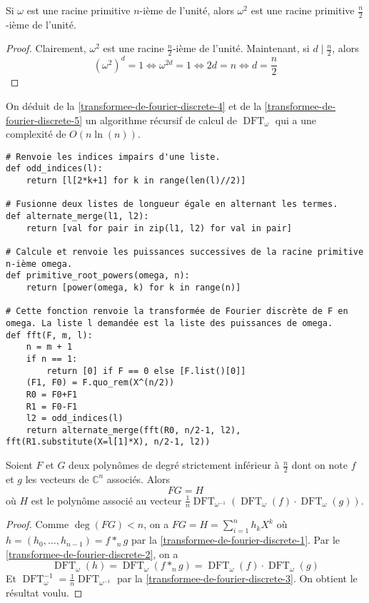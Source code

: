 	\begin{proposition}
		\label{transformee-de-fourier-discrete-5}
		Si $\omega$ est une racine primitive $n$-ième de l'unité, alors $\omega^2$ est une racine primitive $\frac{n}{2}$-ième de l'unité.
	\end{proposition}
	
	\begin{proof}
		Clairement, $\omega^2$ est une racine $\frac{n}{2}$-ième de l'unité. Maintenant, si $d \mid \frac{n}{2}$, alors
		\[ (\omega^2)^d = 1 \iff \omega^{2d} = 1 \iff 2d = n \iff d = \frac{n}{2} \]
	\end{proof}
	
	On déduit de la \cref{transformee-de-fourier-discrete-4} et de la \cref{transformee-de-fourier-discrete-5} un algorithme récursif de calcul de $\operatorname{DFT}_\omega$ qui a une complexité de $O(n \ln(n))$.
	
\begin{lstlisting}
# Renvoie les indices impairs d'une liste.
def odd_indices(l):
	return [l[2*k+1] for k in range(len(l)//2)]

# Fusionne deux listes de longueur égale en alternant les termes.
def alternate_merge(l1, l2):
	return [val for pair in zip(l1, l2) for val in pair]

# Calcule et renvoie les puissances successives de la racine primitive n-ième omega.
def primitive_root_powers(omega, n):
	return [power(omega, k) for k in range(n)]

# Cette fonction renvoie la transformée de Fourier discrète de F en omega. La liste l demandée est la liste des puissances de omega.
def fft(F, m, l):
	n = m + 1
	if n == 1:
		return [0] if F == 0 else [F.list()[0]]
	(F1, F0) = F.quo_rem(X^(n/2))
	R0 = F0+F1
	R1 = F0-F1
	l2 = odd_indices(l)
	return alternate_merge(fft(R0, n/2-1, l2), fft(R1.substitute(X=l[1]*X), n/2-1, l2))
\end{lstlisting}
	
	\begin{theorem}
		Soient $F$ et $G$ deux polynômes de degré strictement inférieur à $\frac{n}{2}$ dont on note $f$ et $g$ les vecteurs de $\mathbb{C}^n$ associés. Alors
		\[ FG = H \]
		où $H$ est le polynôme associé au vecteur $\frac{1}{n} \operatorname{DFT}_{\omega^{-1}} (\operatorname{DFT}_\omega(f) \cdot \operatorname{DFT}_\omega(g))$.
	\end{theorem}
	
	\begin{proof}
		Comme $\deg(FG) < n$, on a $FG = H = \sum_{i=1}^n h_k X^k$ où $h = (h_0, \dots, h_{n-1}) = f *_n g$ par la \cref{transformee-de-fourier-discrete-1}. Par le \cref{transformee-de-fourier-discrete-2}, on a
		\[ \operatorname{DFT}_\omega (h) = \operatorname{DFT}_\omega(f *_n g) = \operatorname{DFT}_\omega(f) \cdot \operatorname{DFT}_\omega(g) \]
		Et $\operatorname{DFT}_\omega^{-1} = \frac{1}{n} \operatorname{DFT}_{\omega^{-1}}$ par la \cref{transformee-de-fourier-discrete-3}. On obtient le résultat voulu.
	\end{proof}
	
